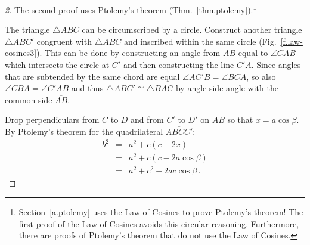 \begin{proof}[2]
The second proof uses Ptolemy's theorem (Thm.~\ref{thm.ptolemy}).\footnote{Section~\ref{a.ptolemy} uses the Law of Cosines to prove Ptolemy's theorem! The first proof of the Law of Cosines avoids this circular reasoning. Furthermore, there are proofs of Ptolemy's theorem that do not use the Law of Cosines.}

The triangle $\triangle ABC$ can be circumscribed by a circle. 
Construct another triangle $\triangle ABC'$ congruent with $\triangle ABC$ and inscribed within the same circle (Fig.~\ref{f.law-cosines3}). This can be done by constructing an angle from $\overline{AB}$ equal to $\angle CAB$ which intersects the circle at $C'$ and then constructing the line $\overline{C'A}$.
Since angles that are subtended by the same chord are equal $\angle AC'B =\angle BCA$, so also $\angle CBA=\angle C'AB$ and thus $\triangle ABC'\cong\triangle BAC$ by angle-side-angle with the common side $\overline{AB}$.

Drop perpendiculars from $C$ to $D$ and from $C'$ to $D'$ on $\overline{AB}$ so that $x=a\cos \beta$. By Ptolemy's theorem for the quadrilateral $\overline{ABCC'}$:
\begin{eqnarray*}
b^2&=&a^2+c(c-2x)\\
&=& a^2 + c(c-2a\cos\beta)\\
&=&a^2+c^2-2ac\cos\beta\,.
\end{eqnarray*}
\end{proof}

